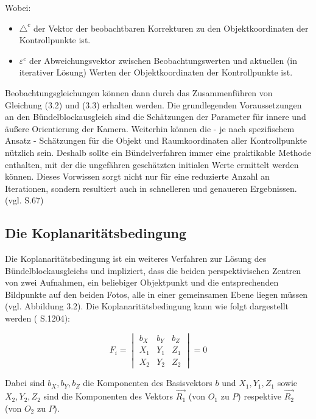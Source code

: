 Wobei:

\begin{itemize}
\item $\triangle^c$ der Vektor der beobachtbaren Korrekturen zu den Objektkoordinaten der Kontrollpunkte ist.

\item $\varepsilon^c$ der Abweichungsvektor zwischen Beobachtungswerten und aktuellen (in iterativer Lösung) Werten der Objektkoordinaten der Kontrollpunkte ist.

\end{itemize}

Beobachtungsgleichungen können dann durch das Zusammenführen von Gleichung (3.2) und (3.3) erhalten werden. Die grundlegenden Voraussetzungen an den Bündelblockausgleich sind die Schätzungen der Parameter für innere und äußere Orientierung der Kamera. Weiterhin können die - je nach spezifischem Ansatz - Schätzungen für die Objekt und Raumkoordinaten aller Kontrollpunkte  nützlich sein. Deshalb sollte ein Bündelverfahren immer eine praktikable Methode enthalten, mit der die ungefähren geschätzten initialen Werte ermittelt werden können. Dieses Vorwissen sorgt nicht nur für eine reduzierte Anzahl an Iterationen, sondern resultiert auch in schnelleren und genaueren Ergebnissen. (vgl. \cite{comparative_conditions_study} S.67)


\subsection{Die Koplanaritätsbedingung}

Die Koplanaritätsbedingung ist ein weiteres Verfahren zur Lösung des Bündelblockausgleichs und impliziert, dass die beiden perspektivischen Zentren von zwei Aufnahmen, ein beliebiger Objektpunkt und die entsprechenden Bildpunkte auf den beiden Fotos, alle in einer gemeinsamen Ebene liegen müssen (vgl. Abbildung 3.2). Die Koplanaritätsbedingung kann wie folgt dargestellt werden (\cite{pose_est_epi} S.1204):

\begin{equation}
F_i = \begin{vmatrix}
b_X & b_Y & b_Z \\
X_1 & Y_1 & Z_1 \\
X_2 & Y_2 & Z_2
\end{vmatrix}
=0
\end{equation}

Dabei sind $b_X,b_Y,b_Z$ die Komponenten des Basisvektors $b$ und $X_1,Y_1,Z_1$ sowie $X_2,Y_2,Z_2$ sind die Komponenten des Vektors $\vec{R_1}$ (von $O_1$ zu $P$) respektive  $\vec{R_2}$ (von $O_2$ zu $P$).


